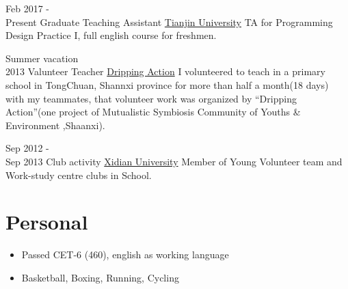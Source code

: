 \documentclass[letterpaper]{twentysecondcv} %
\begin{document}
\begin{twenty}

\twentyitem
	{Feb 2017 - \\ Present}
	{Graduate Teaching Assistant}
	{\href{http://tju.edu.cn/}{Tianjin University}}
	{}
	{TA for Programming Design Practice I, full english course for freshmen.}	

\twentyitem
	{Summer vacation \\ 2013}
	{Valunteer Teacher}
	{\href{http://blog.sina.com.cn/xiaanedu}{Dripping Action}}
	{}
	{I volunteered to teach in a primary school in TongChuan, Shannxi province for more than half a month(18 days) with my teammates, that volunteer work was organized by “Dripping Action”(one project of Mutualistic Symbiosis Community of Youths \& Environment ,Shaanxi).
	}


\twentyitem
	{Sep 2012 - \\ Sep 2013}
	{Club activity}
	{\href{http://www.xidian.edu.cn/}{Xidian University}}
	{}
	{Member of Young Volunteer team and Work-study centre clubs in
School.}	


	
	
\end{twenty}

\section{Personal}

\begin{twenty} %
	
\twentyitem
	{}
	{}
	{}
	{}
	{        
		{\begin{itemize}
    	    \item Passed CET-6 (460), english as working language
    	    \item Basketball, Boxing, Running, Cycling
	    \end{itemize}
     	}
	}	
        
\end{twenty}
\end{document}
